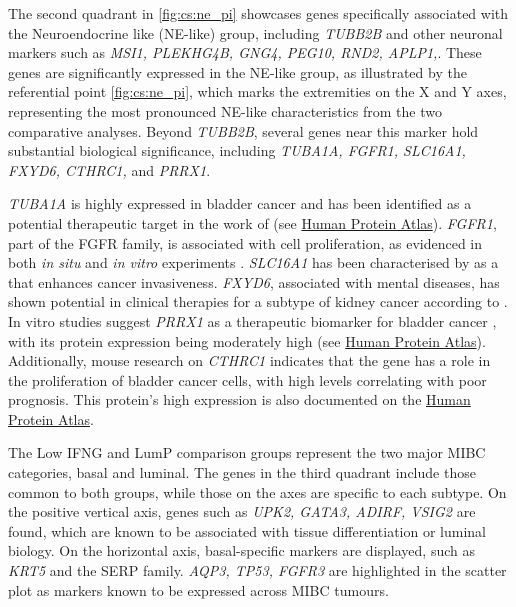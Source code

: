 The second quadrant in \cref{fig:cs:ne_pi} showcases genes specifically associated with the Neuroendocrine like (NE-like) group, including \textit{TUBB2B} and other neuronal markers such as \textit{MSI1, PLEKHG4B, GNG4, PEG10, RND2, APLP1,}\citep{Robertson2017-mg}. These genes are significantly expressed in the NE-like group, as illustrated by the referential point \cref{fig:cs:ne_pi}, which marks the extremities on the X and Y axes, representing the most pronounced NE-like characteristics from the two comparative analyses. Beyond \textit{TUBB2B}, several genes near this marker hold substantial biological significance, including \textit{TUBA1A, FGFR1, SLC16A1, FXYD6, CTHRC1,} and \textit{PRRX1}.

\textit{TUBA1A} is highly expressed in bladder cancer and has been identified as a potential therapeutic target in the work of \citet{Zhang2019-fk} (see \href{https://www.proteinatlas.org/ENSG00000167552-TUBA1A/tissue}{Human Protein Atlas}). \textit{FGFR1}, part of the FGFR family, is associated with cell proliferation, as evidenced in both \textit{in situ} and \textit{in vitro} experiments \citep{Tomlinson2009-td}. \textit{SLC16A1} has been characterised by \citet{Logotheti2020-ya} as a  that enhances cancer invasiveness. \textit{FXYD6}, associated with mental diseases, has shown potential in clinical therapies for a subtype of kidney cancer according to \citet{Gao2014-sq}. In vitro studies suggest \textit{PRRX1} as a therapeutic biomarker for bladder cancer \citep{Huang2022-ez}, with its protein expression being moderately high (see \href{https://www.proteinatlas.org/ENSG00000116132-PRRX1/tissue}{Human Protein Atlas}). Additionally, mouse research on \textit{CTHRC1} indicates that the gene has a role in the proliferation of bladder cancer cells, with high levels correlating with poor prognosis. This protein's high expression is also documented on the \href{https://www.proteinatlas.org/ENSG00000164932-CTHRC1/tissue}{Human Protein Atlas}.

The Low IFNG and LumP comparison groups represent the two major MIBC categories, basal and luminal. The genes in the third quadrant include those common to both groups, while those on the axes are specific to each subtype. On the positive vertical axis, genes such as \textit{UPK2, GATA3, ADIRF, VSIG2} are found, which are known to be associated with tissue differentiation or luminal biology. On the horizontal axis, basal-specific markers are displayed, such as \textit{KRT5} and the SERP family. \textit{AQP3, TP53, FGFR3} are highlighted in the scatter plot as markers known to be expressed across MIBC tumours.


